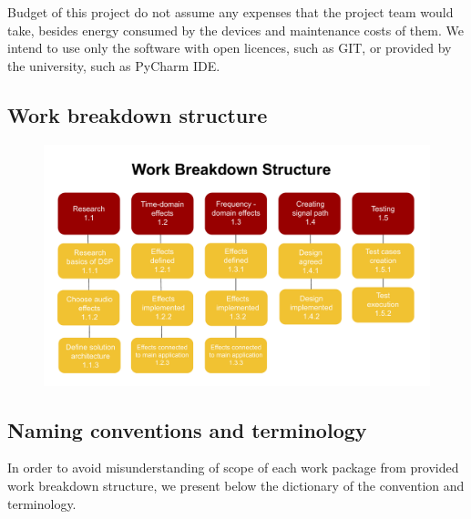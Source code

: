 \documentclass[12pt]{article}
\begin{document}
Budget of this project do not assume any expenses that the project team would take, besides energy consumed by the devices and maintenance costs of them. We intend to use only the software with open licences, such as GIT, or provided by the university, such as PyCharm IDE.

\subsection{Work breakdown structure}

\begin{figure}[H]
		\includegraphics[width=1.2\textwidth, center]{WBS}
\end{figure}

\subsection{Naming conventions and terminology}

In order to avoid misunderstanding of scope of each work package from provided work breakdown structure, we present below the dictionary of the convention and terminology.
\end{document}
